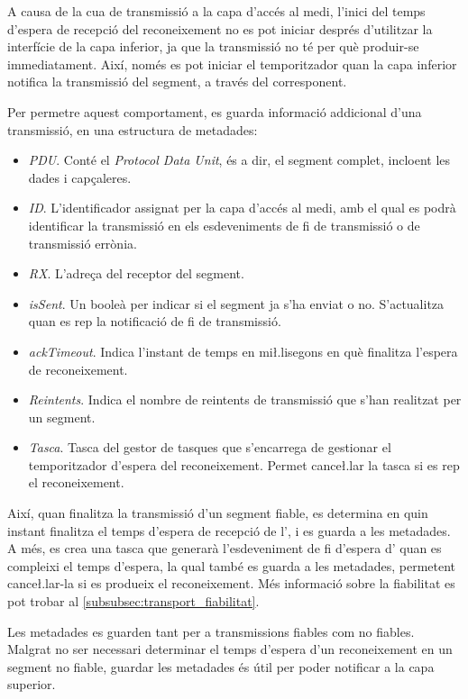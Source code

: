 \documentclass{tfgitic}[2024/07/01]
\begin{document}
{A causa de la cua de transmissió a la capa d'accés al medi, l'inici del temps d'espera de recepció del reconeixement no es pot iniciar després d'utilitzar la interfície de la capa inferior, ja que la transmissió no té per què produir-se immediatament. Així, només es pot iniciar el temporitzador quan la capa inferior notifica la transmissió del segment, a través del  corresponent.

Per permetre aquest comportament, es guarda informació addicional d'una transmissió, en una estructura de metadades:
\begin{itemize}
    \item \emph{PDU}. Conté el \emph{Protocol Data Unit}, és a dir, el segment complet, incloent les dades i capçaleres.
    \item \emph{ID}. L'identificador assignat per la capa d'accés al medi, amb el qual es podrà identificar la transmissió en els esdeveniments de fi de transmissió o de transmissió errònia.
    \item \emph{RX}. L'adreça del receptor del segment.
    \item \emph{isSent}. Un booleà per indicar si el segment ja s'ha enviat o no. S'actualitza quan es rep la notificació de fi de transmissió.
    \item \emph{ackTimeout}. Indica l'instant de temps en mi\l.lisegons en què finalitza l'espera de reconeixement. 
    \item \emph{Reintents}. Indica el nombre de reintents de transmissió que s'han realitzat per un segment.
    \item \emph{Tasca}. Tasca del gestor de tasques que s'encarrega de gestionar el temporitzador d'espera del reconeixement. Permet cance\l.lar la tasca si es rep el reconeixement.
\end{itemize}

Així, quan finalitza la transmissió d'un segment fiable, es determina en quin instant finalitza el temps d'espera de recepció de l', i es guarda a les metadades. A més, es crea una tasca que generarà l'esdeveniment de fi d'espera d' quan es compleixi el temps d'espera, la qual també es guarda a les metadades, permetent cance\l.lar-la si es produeix el reconeixement. Més informació sobre la fiabilitat es pot trobar al \autoref{subsubsec:transport_fiabilitat}.

Les metadades es guarden tant per a transmissions fiables com no fiables. Malgrat no ser necessari determinar el temps d'espera d'un reconeixement en un segment no fiable, guardar les metadades és útil per poder notificar a la capa superior.

}
\end{document}
